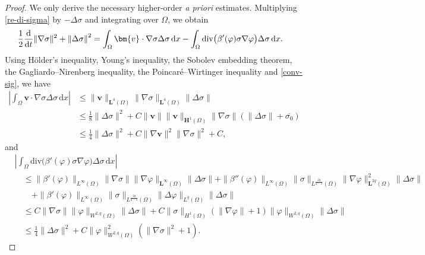 \documentclass[11pt,reqno]{amsart}
\def\L{\bm{L}}
\def\vv{\bm{v}}
\begin{document}
\begin{proof}
We only derive the necessary higher-order \textit{a priori} estimates.
Multiplying \eqref{re-di-sigma} by $-\Delta\sigma$ and integrating over $\Omega$, we obtain
%
\begin{equation}
\begin{aligned}
\frac{1}{2}\frac{\mathrm{d}}{\mathrm{d} t}\|\nabla \sigma\|^2+\left\|\Delta\sigma\right\|^2
&=\int_{\Omega}\vv \cdot \nabla \sigma\Delta\sigma\,\mathrm{d}x
- \int_{\Omega}\mathrm{div}\big(\beta'(\varphi)\sigma \nabla \varphi\big) \Delta\sigma \,\mathrm{d}x.
\end{aligned}
\notag
\end{equation}
%
Using H\"older's inequality, Young's inequality, the Sobolev embedding theorem, the Gagliardo--Nirenberg inequality, the Poincar\'e--Wirtinger inequality and \eqref{conv-sig}, we have
%
\begin{equation*}
\begin{aligned}
\left|\int_{\Omega}\vv \cdot \nabla \sigma \Delta\sigma \,\mathrm{d}x\right|
&\le \|\vv \|_{\L^4(\Omega)}\|\nabla \sigma\|_{\bm{L}^4(\Omega)}\|\Delta\sigma\|\\
&\le \frac18\|\Delta\sigma\|^2 + C\|\vv \|\|\vv \|_{\bm{H}^1(\Omega)}
\|\nabla \sigma\| (\|\Delta\sigma\| + \overline{\sigma_0}) \\
&\le \frac14\|\Delta\sigma\|^2 + C\|\nabla \vv \|^2\|\nabla \sigma\|^2+C,
\end{aligned}
\end{equation*}
and
\begin{equation*}
\begin{aligned}
&\left|\int_{\Omega}\mathrm{div}\big(\beta'(\varphi)\sigma \nabla \varphi\big) \Delta\sigma \,\mathrm{d}x\right|
\\
&\quad\le \|\beta'(\varphi)\|_{L^\infty(\Omega)}\|\nabla \sigma\|\|\nabla \varphi\|_{\bm{L}^\infty(\Omega)}\|\Delta\sigma\|
+ \|\beta''(\varphi)\|_{L^\infty(\Omega)}\|\sigma\|_{L^\frac{2q}{q-2}(\Omega)} \|\nabla \varphi\|^2_{\bm{L}^{2q}(\Omega)}\|\Delta\sigma\|
\\
&\qquad +\|\beta'(\varphi)\|_{L^\infty(\Omega)}\|\sigma\|_{L^\frac{2q}{q-2}(\Omega)} \|\Delta \varphi\|_{L^q(\Omega)}\|\Delta\sigma\| \\
&\quad \leq C \|\nabla \sigma\|\|\varphi\|_{W^{2,q}(\Omega)}\|\Delta \sigma\|
+ C
\| \sigma \|_{H^1(\Omega)}
(\| \nabla \varphi\| +1)
 \| \varphi\|_{W^{2,q}(\Omega)} \| \Delta \sigma\|
\\
&\quad\le \frac14\|\Delta\sigma\|^2
+ C\|\varphi\|_{W^{2,q}(\Omega)}^2(\|\nabla \sigma\|^2+1).

\end{aligned}
\end{equation*}
\end{proof}
\end{document}
